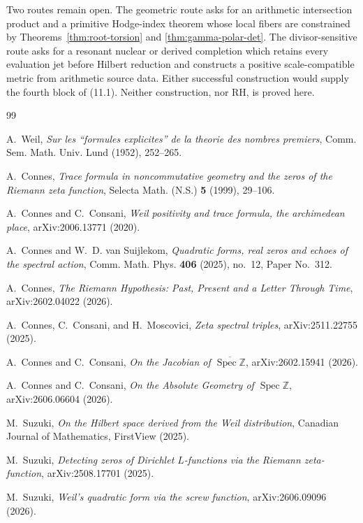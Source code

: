 \documentclass[11pt]{amsart}
\theoremstyle{definition}
\theoremstyle{remark}
\begin{document}
Two routes remain open.  The geometric route asks for an arithmetic
intersection product and a primitive Hodge-index theorem whose local
fibers are constrained by Theorems~\ref{thm:root-torsion} and
\ref{thm:gamma-polar-det}.  The divisor-sensitive route asks for a
resonant nuclear or derived completion which retains every evaluation jet
before Hilbert reduction and constructs a positive scale-compatible metric
from arithmetic source data.  Either successful construction would supply
the fourth block of (11.1).  Neither construction, nor RH, is proved here.

\begin{thebibliography}{99}

A.~Weil,
\emph{Sur les ``formules explicites'' de la theorie des nombres premiers},
Comm. Sem. Math. Univ. Lund (1952), 252--265.

A.~Connes,
\emph{Trace formula in noncommutative geometry and the zeros of the
Riemann zeta function},
Selecta Math. (N.S.) \textbf{5} (1999), 29--106.

A.~Connes and C.~Consani,
\emph{Weil positivity and trace formula, the archimedean place},
arXiv:2006.13771 (2020).

A.~Connes and W.~D. van Suijlekom,
\emph{Quadratic forms, real zeros and echoes of the spectral action},
Comm. Math. Phys. \textbf{406} (2025), no.~12, Paper No.~312.

A.~Connes,
\emph{The Riemann Hypothesis: Past, Present and a Letter Through Time},
arXiv:2602.04022 (2026).

A.~Connes, C.~Consani, and H.~Moscovici,
\emph{Zeta spectral triples},
arXiv:2511.22755 (2025).

A.~Connes and C.~Consani,
\emph{On the Jacobian of \(\overline{\operatorname{Spec}\mathbb Z}\)},
arXiv:2602.15941 (2026).

A.~Connes and C.~Consani,
\emph{On the Absolute Geometry of \(\operatorname{Spec}\mathbb Z\)},
arXiv:2606.06604 (2026).

M.~Suzuki,
\emph{On the Hilbert space derived from the Weil distribution},
Canadian Journal of Mathematics, FirstView (2025).

M.~Suzuki,
\emph{Detecting zeros of Dirichlet \(L\)-functions via the Riemann
zeta-function},
arXiv:2508.17701 (2025).

M.~Suzuki,
\emph{Weil's quadratic form via the screw function},
arXiv:2606.09096 (2026).


\end{thebibliography}
\end{document}
